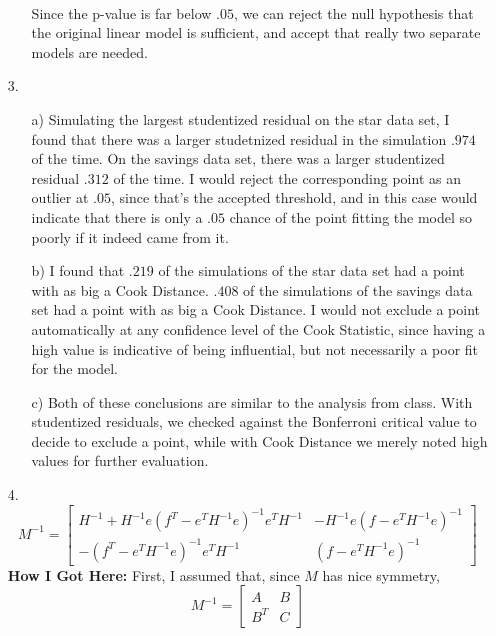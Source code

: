 \documentclass[11pt]{article}
\theoremstyle{definition}
\begin{document}
\begin{itemize}
\begin{itemize}
\begin{table}[ht]
\begin{tabular}{lrrrrrr}
                           \hline
                   \end{tabular}
               \end{table} \\
               Since the p-value is far below $.05$, we can reject the null hypothesis that the original linear model is sufficient, and accept that really two separate models are needed.
        \end{itemize}
    \item[3.]
        \begin{itemize}
            \item[a)]
                Simulating the largest studentized residual on the star data set, I found that there was a larger studetnized residual in the simulation $.974$ of the time. On the savings data set, there was a larger studentized residual $.312$ of the time. I would reject the corresponding point as an outlier at $.05$, since that's the accepted threshold, and in this case would indicate that there is only a $.05$ chance of the point fitting the model so poorly if it indeed came from it.
            \item[b)]
                I found that $.219$ of the simulations of the star data set had a point with as big a Cook Distance. $.408$ of the simulations of the savings data set had a point with as big a Cook Distance. I would not exclude a point automatically at any confidence level of the Cook Statistic, since having a high value is indicative of being influential, but not necessarily a poor fit for the model.
            \item[c)] Both of these conclusions are similar to the analysis from class. With studentized residuals, we checked against the Bonferroni critical value to decide to exclude a point, while with Cook Distance we merely noted high values for further evaluation.
        \end{itemize}
    \item[4.]
        \[ M^{-1} = \left[\begin{array}{cc} H^{-1}+H^{-1}e(f^T-e^TH^{-1}e)^{-1}e^TH^{-1} & -H^{-1}e(f-e^TH^{-1}e)^{-1} \\ -(f^T-e^TH^{-1}e)^{-1}e^TH^{-1} & (f-e^TH^{-1}e)^{-1} \end{array} \right] \]
        {\bf How I Got Here:} First, I assumed that, since $M$ has nice symmetry,
    \[M^{-1} = \left[\begin{array}{cc} A & B \\ B^T & C \end{array}\right] \]

\end{itemize}
\end{document}
